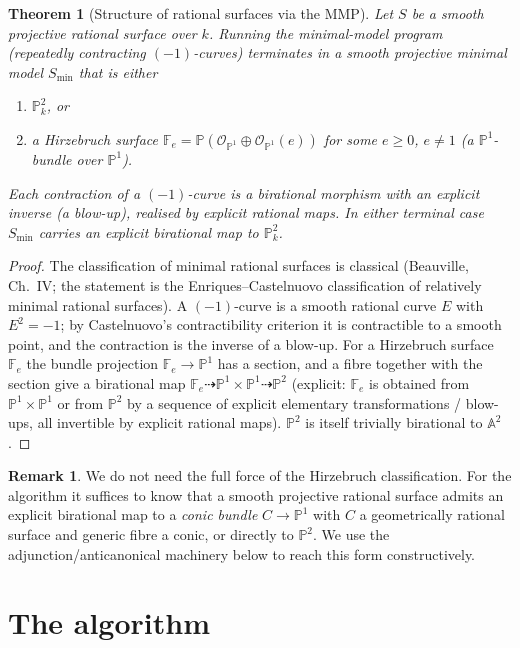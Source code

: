 \documentclass{amsart}
\theoremstyle{plain}
\newtheorem{theorem}{Theorem}
\theoremstyle{definition}
\newtheorem{remark}{Remark}
\newcommand{\PP}{\mathbb{P}}
\newcommand{\AA}{\mathbb{A}}
\newcommand{\cO}{\mathcal{O}}
\begin{document}
\begin{theorem}[Structure of rational surfaces via the MMP]
\label{thm:mmp}
Let $S$ be a smooth projective rational surface over $k$.  Running the
minimal-model program (repeatedly contracting $(-1)$-curves) terminates in a
smooth projective \emph{minimal} model $S_{\min}$ that is either
\begin{enumerate}
\item $\PP^2_k$, or
\item a Hirzebruch surface $\mathbb{F}_e=\PP(\cO_{\PP^1}\oplus\cO_{\PP^1}(e))$
for some $e\ge0$, $e\ne1$ (a $\PP^1$-bundle over $\PP^1$).
\end{enumerate}
Each contraction of a $(-1)$-curve is a birational morphism with an explicit
inverse (a blow-up), realised by explicit rational maps.  In either terminal
case $S_{\min}$ carries an explicit birational map to $\PP^2_k$.
\end{theorem}

\begin{proof}
The classification of minimal rational surfaces is classical
(Beauville, Ch.~IV; the statement is the Enriques--Castelnuovo classification of
relatively minimal rational surfaces).  A $(-1)$-curve is a smooth rational
curve $E$ with $E^2=-1$; by Castelnuovo's contractibility criterion it is
contractible to a smooth point, and the contraction is the inverse of a blow-up.
For a Hirzebruch surface $\mathbb{F}_e$ the bundle projection
$\mathbb{F}_e\to\PP^1$ has a section, and a fibre together with the section give
a birational map $\mathbb{F}_e\dashrightarrow\PP^1\times\PP^1\dashrightarrow\PP^2$
(explicit: $\mathbb{F}_e$ is obtained from $\PP^1\times\PP^1$ or from $\PP^2$ by
a sequence of explicit elementary transformations / blow-ups, all invertible by
explicit rational maps).  $\PP^2$ is itself trivially birational to $\AA^2$.
\end{proof}

\begin{remark}
We do not need the full force of the Hirzebruch classification.  For the
algorithm it suffices to know that a smooth projective rational surface admits
an explicit birational map to a \emph{conic bundle} $C\to\PP^1$ with $C$ a
geometrically rational surface and generic fibre a conic, or directly to
$\PP^2$.  We use the adjunction/anticanonical machinery below to reach this form
constructively.
\end{remark}

\section{The algorithm}
\end{document}

